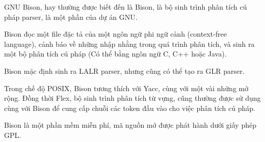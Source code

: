 \documentclass[../report.tex]{subfiles}
\begin{document}
GNU Bison, hay thường được biết đến là Bison, là bộ sinh 
trình phân tích cú pháp parser, là một phần của dự án GNU. 
\cite{wikipedia}

Bison đọc một file đặc tả của một ngôn ngữ phi ngữ cảnh
(context-free language), cảnh báo về những nhập nhằng 
trong quá trình phân tích, và sinh ra một bộ phân tích cú pháp
(Có thể bằng ngôn ngữ C, C++ hoặc Java). 

Bison mặc định sinh ra LALR parser, nhưng cũng có 
thể tạo ra GLR parser.

Trong chế độ POSIX, Bison tương thích với Yacc, 
cùng với một vài những mở rộng. Đồng thời Flex, bộ sinh trình phân 
tích từ vựng, cũng thường được sử dụng cùng với Bison để cung cấp 
chuỗi các token đầu vào cho việc phân tích cú pháp. 

Bison là một phần mềm miễn phí, mã nguồn mở được phát hành dưới 
giấy phép GPL. 
\end{document}
